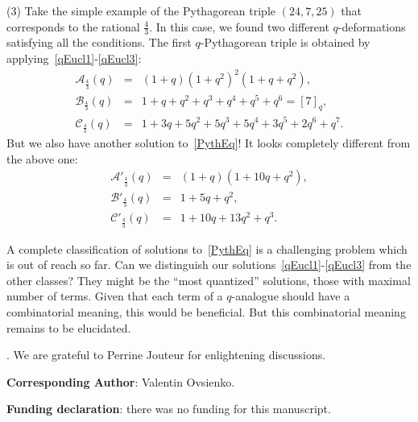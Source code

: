 \documentclass{article}[12pt]
\theoremstyle{plain}
\theoremstyle{definition}
\newcommand{\A}{\mathcal{A}}
\newcommand{\B}{\mathcal{B}}
\newcommand{\cC}{\mathcal{C}}
\begin{document}
(3) 
Take the simple example of the Pythagorean triple $(24,7,25)$
that corresponds to the rational $\frac{4}{3}$.
In this case, we found two different $q$-deformations satisfying all the conditions.
The first $q$-Pythagorean triple is obtained by applying~\eqref{qEucl1}-\eqref{qEucl3}:
\begin{eqnarray*}
\A_{\frac{4}{3}}(q) &=& (1+q)(1+q^2)^2(1+q+q^2),
\\[4pt]
\B_{\frac{4}{3}}(q) &=& 1+q+q^2+q^3+q^4+q^5+q^6=[7]_q,
\\[4pt]
\cC_{\frac{4}{3}}(q) &=& 1+3q+5q^2+5q^3+5q^4+3q^5+2q^6+q^7.
\end{eqnarray*}
But we also have another solution to~\eqref{PythEq}!
It looks completely different from the above one:
\begin{eqnarray*}
\A'_{\frac{4}{3}}(q) &=& (1+q)(1 + 10q + q^2),
\\[4pt]
\B'_{\frac{4}{3}}(q) &=& 1 + 5q + q^2,
\\[4pt]
\cC'_{\frac{4}{3}}(q) &=& 1 + 10q + 13q^2 +q^3.
\end{eqnarray*}

A complete classification of solutions to~\eqref{PythEq} is a challenging problem
which is out of reach so far.
Can we distinguish our solutions~\eqref{qEucl1}-\eqref{qEucl3} from the other classes? 
They might be the ``most quantized'' solutions, those with maximal number of terms.
Given that each term of a $q$-analogue should have a combinatorial meaning, 
this would be beneficial.
But this combinatorial meaning remains to be elucidated.

\bigskip

.
We are grateful to Perrine Jouteur for enlightening discussions.

\bigskip

\noindent
{\bf Corresponding Author}: Valentin Ovsienko.

\bigskip

\noindent
{\bf Funding declaration}: there was no funding for this manuscript.
\end{document}
